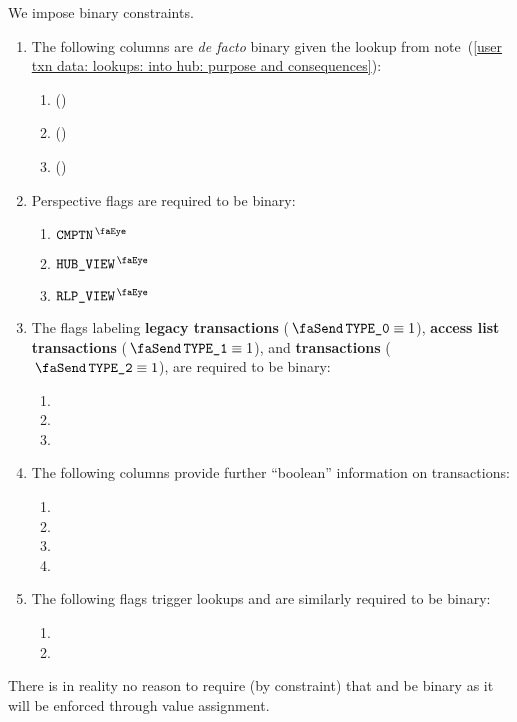 We impose binary constraints.
\begin{enumerate}
	\item
		The following columns are \emph{de facto} binary given the lookup from
		note~(\ref{user txn data: lookups: into hub: purpose and consequences}):
		\begin{enumerate}
			\item \sysi{} \quad (\sanityCheck)
			\item \user{} \quad (\sanityCheck)
			\item \sysf{} \quad (\sanityCheck)
		\end{enumerate}
	\item
		Perspective flags are required to be binary:
		\begin{enumerate}
			\item $\isUserTxnComputation$
			\item $\isUserTxnHubView$
			\item $\isUserTxnRlpView$
		\end{enumerate}
	\item
		The flags labeling
		\textbf{legacy transactions} ($\txIsLegacy \equiv 1$),
		\textbf{access list transactions} ($\txIsAccessSet \equiv 1$), and
		\textbf{\cite{EIP-1559} transactions} ($\txIsTypeTwo \equiv 1$),
		are required to be binary:
		\begin{enumerate}
			\item \txIsLegacy{}
			\item \txIsAccessSet{}
			\item \txIsTypeTwo{}
		\end{enumerate}
	\item
		The following columns provide further ``boolean'' information on transactions:
		\begin{enumerate}
			\item \txIsDeployment{}
			\item \txStatusCode{}
			\item \txCopyTxcd{}
			\item \txRequiresEvmExecution{}
		\end{enumerate}
	\item
		The following flags trigger lookups and are similarly required to be binary:
		\begin{enumerate}
			\item \eucFlag{}
			\item \wcpFlag{}
		\end{enumerate}
\end{enumerate}
\saNote{}
There is in reality no reason to require (by constraint) that \txCopyTxcd{} and \isLastTxOfBlock{} be binary as it will be enforced through value assignment.
